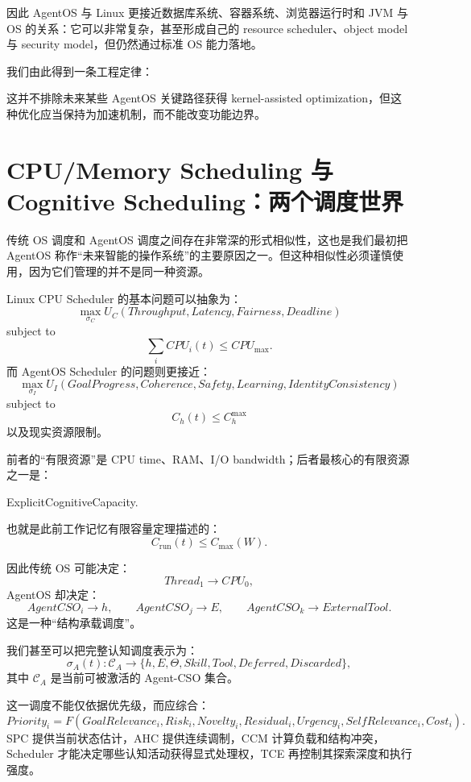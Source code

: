 因此 AgentOS 与 Linux 更接近数据库系统、容器系统、浏览器运行时和 JVM 与 OS 的关系：它可以非常复杂，甚至形成自己的 resource scheduler、object model 与 security model，但仍然通过标准 OS 能力落地。

我们由此得到一条工程定律：
\begin{statementbox}
\centering
{}
\end{statementbox}
这并不排除未来某些 AgentOS 关键路径获得 kernel-assisted optimization，但这种优化应当保持为加速机制，而不能改变功能边界。

\section{CPU/Memory Scheduling 与 Cognitive Scheduling：两个调度世界}

传统 OS 调度和 AgentOS 调度之间存在非常深的形式相似性，这也是我们最初把 AgentOS 称作“未来智能的操作系统”的主要原因之一。但这种相似性必须谨慎使用，因为它们管理的并不是同一种资源。

Linux CPU Scheduler 的基本问题可以抽象为：
\[
\max_{\sigma_C}
U_C(
Throughput,
Latency,
Fairness,
Deadline
)
\]
subject to
\[
\sum_i CPU_i(t)
\leq
CPU_{\max}.
\]
而 AgentOS Scheduler 的问题则更接近：
\[
\max_{\sigma_I}
U_I(
GoalProgress,
Coherence,
Safety,
Learning,
IdentityConsistency
)
\]
subject to
\[
C_h(t)
\leq
C_h^{\max}
\]
以及现实资源限制。

前者的“有限资源”是 CPU time、RAM、I/O bandwidth；后者最核心的有限资源之一是：
\begin{statementbox}
ExplicitCognitiveCapacity.
\end{statementbox}
也就是此前工作记忆有限容量定理描述的：
\[
C_{\mathrm{run}}(t)
\leq
C_{\max}(W).
\]

因此传统 OS 可能决定：
\[
Thread_1\rightarrow CPU_0,
\]
AgentOS 却决定：
\[
AgentCSO_i\rightarrow h,
\qquad
AgentCSO_j\rightarrow E,
\qquad
AgentCSO_k\rightarrow ExternalTool.
\]
这是一种“结构承载调度”。

我们甚至可以把完整认知调度表示为：
\[
\sigma_A(t):
\mathcal C_A
\rightarrow
\{
h,E,\Theta,Skill,Tool,Deferred,Discarded
\},
\]
其中 $\mathcal C_A$ 是当前可被激活的 Agent-CSO 集合。

这一调度不能仅依据优先级，而应综合：
\[
Priority_i
=
F(
GoalRelevance_i,
Risk_i,
Novelty_i,
Residual_i,
Urgency_i,
SelfRelevance_i,
Cost_i
).
\]
SPC 提供当前状态估计，AHC 提供连续调制，CCM 计算负载和结构冲突，Scheduler 才能决定哪些认知活动获得显式处理权，TCE 再控制其探索深度和执行强度。

